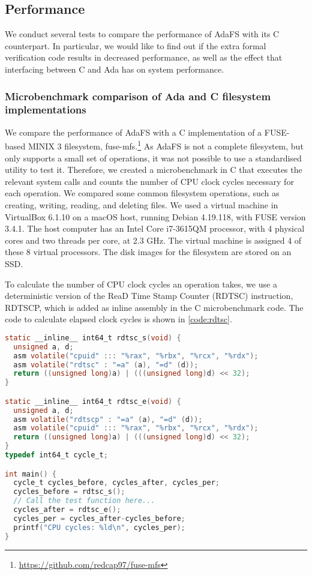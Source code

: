 \subsection{Performance}
We conduct several tests to compare the performance of AdaFS with its C counterpart.
In particular, we would like to find out if the extra formal verification code results in decreased performance, as well as the effect that interfacing between C and Ada has on system performance.

\subsubsection{Microbenchmark comparison of Ada and C filesystem implementations}
We compare the performance of AdaFS with a C implementation of a FUSE-based MINIX 3 filesystem, fuse-mfs.\footnote{\url{https://github.com/redcap97/fuse-mfs}}
As AdaFS is not a complete filesystem, but only supports a small set of operations, it was not possible to use a standardised utility to test it.
Therefore, we created a microbenchmark in C that executes the relevant system calls and counts the number of CPU clock cycles necessary for each operation.
We compared some common filesystem operations, such as creating, writing, reading, and deleting files.
We used a virtual machine in VirtualBox 6.1.10 on a macOS host, running Debian 4.19.118, with FUSE version 3.4.1.
The host computer has an Intel Core i7-3615QM processor, with 4 physical cores and two threads per core, at 2.3 GHz.
The virtual machine is assigned 4 of these 8 virtual processors.
The disk images for the filesystem are stored on an SSD.

To calculate the number of CPU clock cycles an operation takes, we use a deterministic version of the ReaD Time Stamp Counter (RDTSC) instruction, RDTSCP, which is added as inline assembly in the C microbenchmark code.
The code to calculate elapsed clock cycles is shown in \autoref{code:rdtsc}.

\begin{lstlisting}[float=tb,caption={Calculating clock cycles.}, label={code:rdtsc}, language=C]
static __inline__ int64_t rdtsc_s(void) {
  unsigned a, d;
  asm volatile("cpuid" ::: "%rax", "%rbx", "%rcx", "%rdx");
  asm volatile("rdtsc" : "=a" (a), "=d" (d));
  return ((unsigned long)a) | (((unsigned long)d) << 32);
}

static __inline__ int64_t rdtsc_e(void) {
  unsigned a, d;
  asm volatile("rdtscp" : "=a" (a), "=d" (d));
  asm volatile("cpuid" ::: "%rax", "%rbx", "%rcx", "%rdx");
  return ((unsigned long)a) | (((unsigned long)d) << 32);
}
typedef int64_t cycle_t;

int main() {
  cycle_t cycles_before, cycles_after, cycles_per;
  cycles_before = rdtsc_s();
  // Call the test function here...
  cycles_after = rdtsc_e();
  cycles_per = cycles_after-cycles_before;
  printf("CPU cycles: %ld\n", cycles_per);
}
\end{lstlisting}

